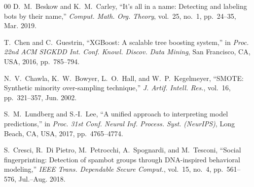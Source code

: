 \documentclass[conference]{IEEEtran}
\begin{document}
\begin{thebibliography}{00}
D.~M.~Beskow and K.~M.~Carley,
``It's all in a name: Detecting and labeling bots by their name,''
\textit{Comput. Math. Org. Theory}, vol.~25, no.~1, pp.~24--35, Mar. 2019.

T.~Chen and C.~Guestrin,
``XGBoost: A scalable tree boosting system,''
in \textit{Proc. 22nd ACM SIGKDD Int. Conf. Knowl. Discov. Data Mining},
San Francisco, CA, USA, 2016, pp.~785--794.

N.~V.~Chawla, K.~W.~Bowyer, L.~O.~Hall, and W.~P.~Kegelmeyer,
``SMOTE: Synthetic minority over-sampling technique,''
\textit{J. Artif. Intell. Res.}, vol.~16, pp.~321--357, Jun. 2002.

S.~M.~Lundberg and S.-I.~Lee,
``A unified approach to interpreting model predictions,''
in \textit{Proc. 31st Conf. Neural Inf. Process. Syst. (NeurIPS)},
Long Beach, CA, USA, 2017, pp.~4765--4774.

S.~Cresci, R.~Di Pietro, M.~Petrocchi, A.~Spognardi, and M.~Tesconi,
``Social fingerprinting: Detection of spambot groups through DNA-inspired
behavioral modeling,''
\textit{IEEE Trans. Dependable Secure Comput.}, vol.~15, no.~4,
pp.~561--576, Jul.--Aug. 2018.

\end{thebibliography}
\end{document}
